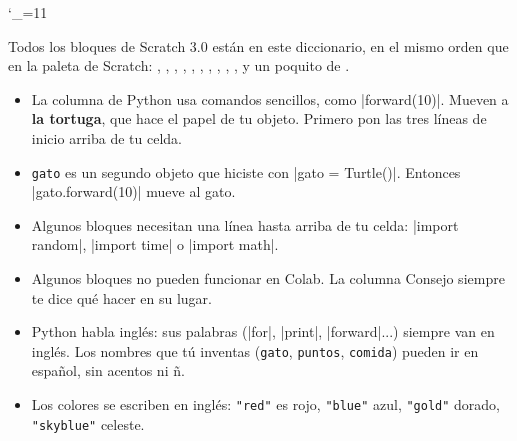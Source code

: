 {\catcode`\_=11 \gdef\blockmusic{\_penfalse\scr_normalblock{scrpen}}}


Todos los bloques de Scratch 3.0 están en este diccionario, en el mismo orden que en la paleta de Scratch: , , , , , , , , , ,  y un poquito de .

\begin{itemize}
  \item La columna de Python usa comandos sencillos, como \py|forward(10)|. Mueven a \textbf{la tortuga}, que hace el papel de tu objeto. Primero pon las tres líneas de inicio arriba de tu celda.
  \item \texttt{gato} es un segundo objeto que hiciste con \py|gato = Turtle()|. Entonces \py|gato.forward(10)| mueve al gato.
  \item Algunos bloques necesitan una línea hasta arriba de tu celda: \py|import random|, \py|import time| o \py|import math|.
  \item Algunos bloques no pueden funcionar en Colab. La columna Consejo siempre te dice qué hacer en su lugar.
  \item Python habla inglés: sus palabras (\py|for|, \py|print|, \py|forward|...) siempre van en inglés. Los nombres que tú inventas (\texttt{gato}, \texttt{puntos}, \texttt{comida}) pueden ir en español, sin acentos ni ñ.
  \item Los colores se escriben en inglés: \texttt{"red"} es rojo, \texttt{"blue"} azul, \texttt{"gold"} dorado, \texttt{"skyblue"} celeste.
\end{itemize}

